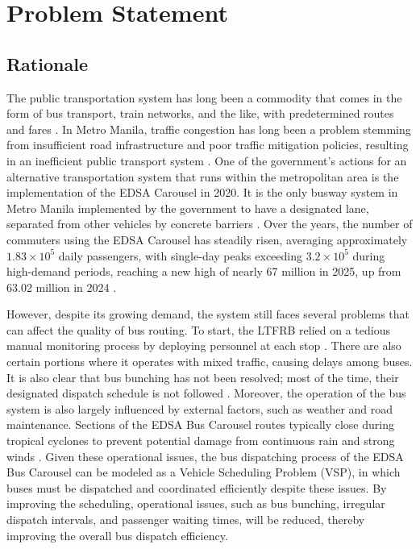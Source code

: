 \chapter{Problem Statement}

\section{Rationale}
The public transportation system has long been a commodity that comes in the form of bus transport, train networks, and the like, with predetermined routes and fares \cite{Tironi2018}. In Metro Manila, traffic congestion has long been a problem stemming from insufficient road infrastructure and poor traffic mitigation policies, resulting in an inefficient public transport system \cite{Spatio2026}. One of the government's actions for an alternative transportation system that runs within the metropolitan area is the implementation of the EDSA Carousel in 2020. It is the only busway system in Metro Manila implemented by the government to have a designated lane, separated from other vehicles by concrete barriers \cite{Chua2026}. Over the years, the number of commuters using the EDSA Carousel has steadily risen, averaging approximately $1.83\times10^5$ daily passengers, with single-day peaks exceeding $3.2\times10^5$ during high-demand periods, reaching a new high of nearly 67 million in 2025, up from 63.02 million in 2024 
\cite{DOTr2025Ridership}. 


However, despite its growing demand, the system still faces several problems that can affect the quality of bus routing. To start, the LTFRB relied on a tedious manual monitoring process by deploying personnel at each stop \cite{EDSApolicy2023}. There are also certain portions where it operates with mixed traffic, causing delays among buses. It is also clear that bus bunching has not been resolved; most of the time, their designated dispatch schedule is not followed \cite{Ollero2024EDSA}. Moreover, the operation of the bus system is also largely influenced by external factors, such as weather and road maintenance. Sections of the EDSA Bus Carousel routes typically close during tropical cyclones to prevent potential damage from continuous rain and strong winds \cite{DOTr2020Suspension}. Given these operational issues, the bus dispatching process of the EDSA Bus Carousel can be modeled as a Vehicle Scheduling Problem (VSP), in which buses must be dispatched and coordinated efficiently despite these issues. By improving the scheduling, operational issues, such as bus bunching, irregular dispatch intervals, and passenger waiting times, will be reduced, thereby improving the overall bus dispatch efficiency.

